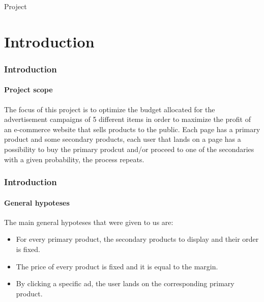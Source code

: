 \documentclass[11pt]{beamer}
\begin{document}
\frame{\titlepage}

\begin{frame}{Project}
    \tableofcontents[hideallsubsections]
\end{frame}


\AtBeginSection[]
{
\begin{frame}{}
    \tableofcontents[sections={\thesection}]
\end{frame}
}


\section{Introduction}


\begin{frame}

\frametitle{Introduction}
\framesubtitle{Project scope}

The focus of this project is to optimize the budget allocated for the advertisement campaigns of 5 different items in order to maximize the profit of an e-commerce website that sells products to the public.
Each page has a primary product and some secondary products, each user that lands on a page has a possibility to buy the primary prodcut and/or proceed to one of the secondaries with a given probability, the process repeats.

\end{frame}


\begin{frame}

\frametitle{Introduction}
\framesubtitle{General hypoteses}

The main general hypoteses that were given to us are:
\begin{itemize}[label={-}]
    \item For every primary product, the secondary products to display and their order is fixed.
    \item The price of every product is fixed and it is equal to the margin.
    \item By clicking a specific ad, the user lands on the corresponding primary product.
\end{itemize}

\end{frame}
\end{document}
